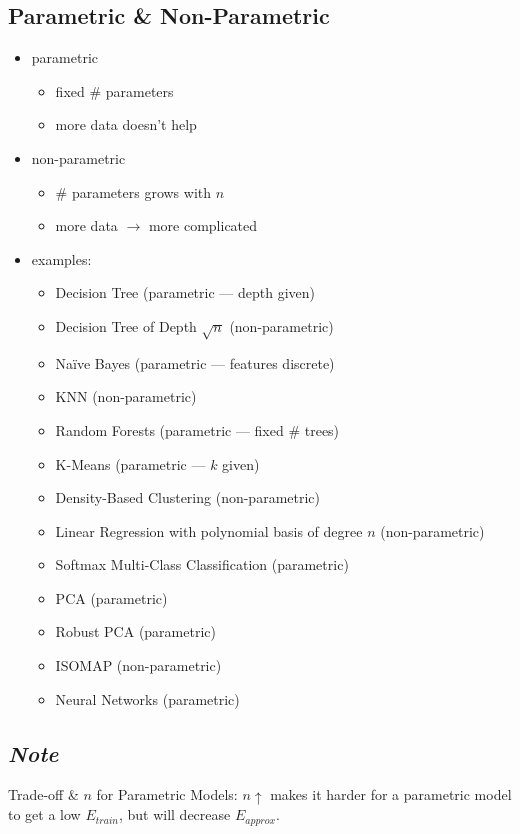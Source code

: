 \documentclass[10pt,landscape,a4paper]{article}
\begin{document}
\begin{multicols*}{5}
\section{Parametric \& Non-Parametric}
\begin{itemize}
    \item parametric
    \begin{itemize}
        \item fixed \# parameters
        \item more data doesn't help
    \end{itemize}
    \item non-parametric
    \begin{itemize}
        \item \# parameters grows with \(n\)
        \item more data \(\rightarrow \)  more complicated
    \end{itemize}
    \item examples:
    \begin{itemize}
        \item Decision Tree (parametric --- depth given)
        \item Decision Tree of Depth \(\sqrt{n}\) (non-parametric)
        \item Naïve Bayes (parametric --- features discrete)
        \item KNN (non-parametric)
        \item Random Forests (parametric --- fixed \# trees)
        \item K-Means (parametric --- \(k\) given)
        \item Density-Based Clustering (non-parametric)
        \item Linear Regression with polynomial basis of degree \(n\) (non-parametric)
        \item Softmax Multi-Class Classification (parametric)
        \item PCA (parametric)
        \item Robust PCA (parametric)
        \item ISOMAP (non-parametric)
        \item Neural Networks (parametric)
    \end{itemize}
\end{itemize}

\subsection{\emph{Note}}
Trade-off \& \(n\) for Parametric Models: \(n \uparrow \) makes it harder for a parametric model to get a low \(E_{train}\), but will decrease \(E_{approx}\).


\end{multicols*}
\end{document}
